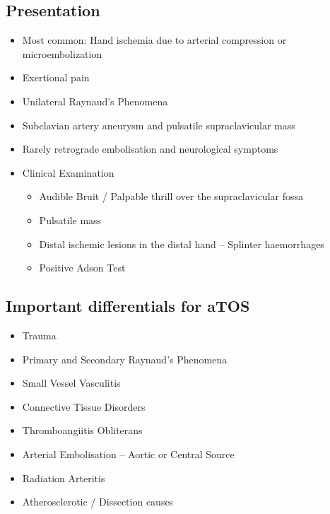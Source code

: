 \documentclass[
]{book}
\begin{document}
\hypertarget{presentation-1}{%
\subsection{Presentation}\label{presentation-1}}

\begin{itemize}
\item
  Most common: Hand ischemia due to arterial compression or
  microembolization
\item
  Exertional pain~
\item
  Unilateral Raynaud's Phenomena
\item
  Subclavian artery aneurysm and pulsatile supraclavicular mass
\item
  Rarely retrograde embolisation and neurological symptoms~
\item
  Clinical Examination

  \begin{itemize}
  \item
    Audible Bruit / Palpable thrill over the supraclavicular fossa
  \item
    Pulsatile mass
  \item
    Distal ischemic lesions in the distal hand -- Splinter
    haemorrhages
  \item
    Positive Adson Test
  \end{itemize}
\end{itemize}

\hypertarget{important-differentials-for-atos}{%
\subsection{Important differentials for aTOS}\label{important-differentials-for-atos}}

\begin{itemize}
\item
  Trauma
\item
  Primary and Secondary Raynaud's Phenomena
\item
  Small Vessel Vasculitis
\item
  Connective Tissue Disorders
\item
  Thromboangiitis Obliterans
\item
  Arterial Embolisation -- Aortic or Central Source
\item
  Radiation Arteritis
\item
  Atherosclerotic / Dissection causes
\end{itemize}
\end{document}

